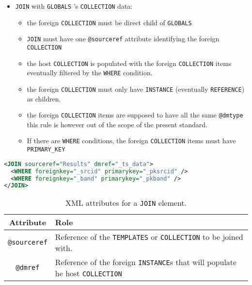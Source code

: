 \begin{itemize}
   \item \texttt{JOIN}  with \texttt{GLOBALS} 's \texttt{COLLECTION} data:
       \begin{itemize}
         \item the foreign \texttt{COLLECTION} must be direct child of \texttt{GLOBALS} 
         \item \texttt{JOIN} must have one \texttt{@sourceref} attribute identifying the foreign \texttt{COLLECTION} 
         \item the host \texttt{COLLECTION} is populated with the foreign \texttt{COLLECTION} items eventually filtered by the \texttt{WHERE} condition.
         \item the foreign \texttt{COLLECTION} must only have \texttt{INSTANCE}  (eventually \texttt{REFERENCE}) as children.
         \item the foreign \texttt{COLLECTION} items are supposed to have all the same \texttt{@dmtype}  this rule is however out of the scope of the present standard.
         \item If there are \texttt{WHERE} conditions, the foreign \texttt{COLLECTION} items must have \texttt{PRIMARY\_KEY} 
  \end{itemize}
\end{itemize}

\begin{lstlisting}[label={lst:join},caption={\texttt{JOIN example with 2 join conditions.} },language=XML]
<JOIN sourceref="Results" dmref="_ts_data">
  <WHERE foreignkey="_srcid" primarykey="_pksrcid" />
  <WHERE foreignkey="_band" primarykey="_pkband" />
</JOIN>
\end{lstlisting}

\begin{table}[!htbp]
\small
\centering
\begin{tabulary}{\linewidth}{|c|J|}       
       \hline 
            \textbf{Attribute} & 
            \textbf {Role}\\
       \hline         \hline  
             \texttt{@sourceref} & 
            Reference of the \texttt{TEMPLATES} or \texttt{COLLECTION} to be joined with. \\
        \hline 
            \texttt{@dmref} & 
            Reference of the foreign \texttt{INSTANCE}s that will populate he host \texttt{COLLECTION}  \\
        \hline 
     \end{tabulary}
     \caption{XML attributes for a \texttt{JOIN} element.} 
     \label{tbl:join-att}
 \end{table}

